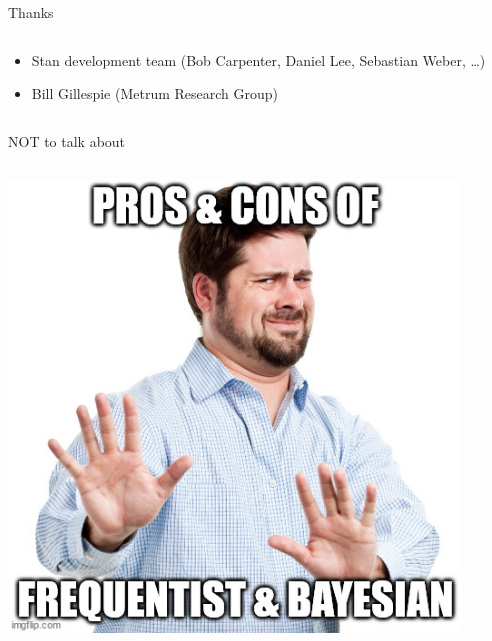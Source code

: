 \documentclass[bigger]{beamer}
\begin{document}
\begin{frame}[label={sec:org0ad579e}]{Thanks}
\begin{columns}
\begin{column}{0.5\columnwidth}
\begin{itemize}
\item Stan development team (Bob Carpenter, Daniel Lee, Sebastian Weber, \ldots{})
\item Bill Gillespie (Metrum Research Group)
\end{itemize}
\end{column}
\end{columns}
\end{frame}



\begin{frame}[label={sec:orgdffadf6}]{NOT to talk about}
\begin{columns}
\begin{column}{0.33\columnwidth}
\begin{center}
\includegraphics[width=0.9\textwidth]{./figure/dont_want_2.jpg}
\end{center}
\end{column}



\end{columns}
\end{frame}
\end{document}
